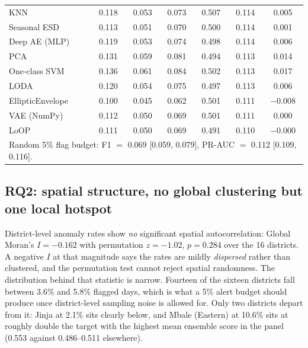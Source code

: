 \documentclass[preprint,12pt]{elsarticle}
\begin{document}
\begin{table}[h]
\begin{tabular}{lcccccc}
KNN                   & 0.118 & 0.053 & 0.073 & 0.507 & 0.114 & 0.005 \\
Seasonal ESD          & 0.113 & 0.051 & 0.070 & 0.500 & 0.114 & 0.001 \\
Deep AE (MLP)         & 0.119 & 0.053 & 0.074 & 0.498 & 0.114 & 0.006 \\
PCA                   & 0.131 & 0.059 & 0.081 & 0.494 & 0.113 & 0.014 \\
One-class SVM         & 0.136 & 0.061 & 0.084 & 0.502 & 0.113 & 0.017 \\
LODA                  & 0.120 & 0.054 & 0.075 & 0.497 & 0.113 & 0.006 \\
EllipticEnvelope      & 0.100 & 0.045 & 0.062 & 0.501 & 0.111 & $-$0.008 \\
VAE (NumPy)           & 0.112 & 0.050 & 0.069 & 0.501 & 0.111 & 0.000 \\
LoOP                  & 0.111 & 0.050 & 0.069 & 0.491 & 0.110 & $-$0.000 \\
\midrule
\multicolumn{7}{l}{Random 5\% flag budget: F1 $=$ 0.069 [0.059, 0.079], PR-AUC $=$ 0.112 [0.109, 0.116].}\\
\bottomrule
\end{tabular}
\end{table}

\subsection{RQ2: spatial structure, no global clustering but one local hotspot}
\label{sec:rq2}
District-level anomaly rates show \emph{no} significant spatial autocorrelation:
Global Moran's $I=-0.162$ with permutation $z=-1.02$, $p=0.284$ over the 16
districts. A negative $I$ at that magnitude says the rates are mildly
\emph{dispersed} rather than clustered, and the permutation test cannot reject
spatial randomness. The distribution behind that statistic is narrow. Fourteen of
the sixteen districts fall between 3.6\% and 5.8\% flagged days, which is what a
5\% alert budget should produce once district-level sampling noise is allowed for.
Only two districts depart from it: Jinja at 2.1\% sits clearly below, and Mbale
(Eastern) at 10.6\% sits at roughly double the target with the highest mean
ensemble score in the panel (0.553 against 0.486--0.511 elsewhere).
\end{document}
